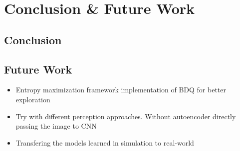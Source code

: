 
\chapter{Conclusion \& Future Work}\label{chapter:conclusion}

\section{Conclusion}


\section{Future Work}

\begin{itemize}
    \item Entropy maximization framework implementation of BDQ for better exploration
    \item Try with different perception approaches. Without autoencoder directly passing the image to CNN
    \item Transfering the models learned in simulation to real-world
\end{itemize}